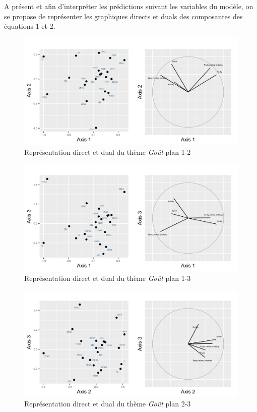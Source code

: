 \documentclass[a4paper,french,10pt]{article}
\begin{document}
A présent et afin d'interpréter les prédictions suivant les variables du modèle, on se propose de représenter les graphiques directs et duals des composantes des équations 1 et 2.

\begin{figure}[htp] 
	\centering
	\includegraphics[scale=0.45]{images/Plot.IndVar_B3_1.2.png}
	\caption{Représentation direct et dual du thème \textit{Goût} plan 1-2}
\end{figure}
\begin{figure}[htp] 
	\centering
	\includegraphics[scale=0.45]{images/Plot.IndVar_B3_1.3.png}
	\caption{Représentation direct et dual du thème \textit{Goût} plan 1-3}
\end{figure}
\begin{figure}[htp] 
	\centering
	\includegraphics[scale=0.45]{images/Plot.IndVar_B3_2.3.png}
	\caption{Représentation direct et dual du thème \textit{Goût} plan 2-3}
\end{figure}
\end{document}
